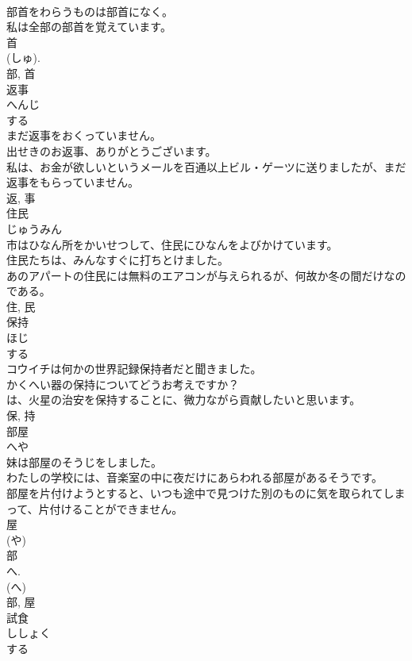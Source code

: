\documentclass[8pt]{extreport}
\begin{document}
\begin{CJK}{UTF8}{min}
\\	部首をわらうものは部首になく。	
\\	私は全部の部首を覚えています。	
\\	首 
\\	(しゅ). 
\\	部, 首	
\\	返事	
\\	へんじ	
\\	する 
\\	まだ返事をおくっていません。	
\\	出せきのお返事、ありがとうございます。	
\\	私は、お金が欲しいというメールを百通以上ビル・ゲーツに送りましたが、まだ返事をもらっていません。	
\\	返, 事	
\\	住民	
\\	じゅうみん	
\\	市はひなん所をかいせつして、住民にひなんをよびかけています。	
\\	住民たちは、みんなすぐに打ちとけました。	
\\	あのアパートの住民には無料のエアコンが与えられるが、何故か冬の間だけなのである。	
\\	住, 民	
\\	保持	
\\	ほじ	
\\	する 
\\	コウイチは何かの世界記録保持者だと聞きました。	
\\	かくへい器の保持についてどうお考えですか？	
\\	は、火星の治安を保持することに、微力ながら貢献したいと思います。	
\\	保, 持	
\\	部屋	
\\	へや	
\\	妹は部屋のそうじをしました。	
\\	わたしの学校には、音楽室の中に夜だけにあらわれる部屋があるそうです。	
\\	部屋を片付けようとすると、いつも途中で見つけた別のものに気を取られてしまって、片付けることができません。	
\\	屋 
\\	(や) 
\\	部 
\\	へ. 
\\	(へ) 
\\	部, 屋	
\\	試食	
\\	ししょく	
\\	する 

\end{CJK}
\end{document}
